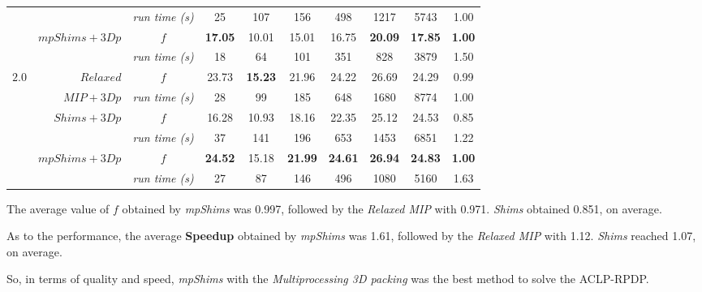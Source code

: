 \documentclass[preprint,authoryear]{elsarticle}
\begin{document}
\begin{table}[H]
\begin{tabular}{crcccccccc}
		&                                 & {\it run time (s)} &    25     &    107    &     156   &    498    &    1217   &   5743    &     1.00  \\%
		\cmidrule{2-10}		                       
		&\multirow{2}{*}{ $mpShims+3Dp$}      & $f$                &{\bf 17.05}&   10.01   &   15.01   &   16.75   &{\bf 20.09}&{\bf 17.85}&{\bf 1.00} \\%
		&                                 & {\it run time (s)} &    18     &    64     &     101   &    351    &   828     &  3879     &     1.50  \\%
		\toprule
		\multirow{7}{*}{$2.0$}&$Relaxed$  & $f$                &     23.73 &{\bf 15.23}&   21.96   &   24.22   &   26.69   &    24.29  &     0.99  \\%
		&                       $MIP+3Dp$     & {\it run time (s)} &    28     &     99    &     185   &    648    &   1680    &   8774    &     1.00  \\%
		\cmidrule{2-10}		                       
		&\multirow{2}{*}{ $Shims+3Dp$}        & $f$                &   16.28   &   10.93   &   18.16   &   22.35   &   25.12   &   24.53   &     0.85  \\%
		&                                 & {\it run time (s)} &    37     &    141    &   196     &     653   &   1453    &   6851    &     1.22  \\%
		\cmidrule{2-10}		                       
		&\multirow{2}{*}{ $mpShims+3Dp$}      & $f$                &{\bf 24.52}&   15.18   &{\bf 21.99}&{\bf 24.61}&{\bf 26.94}&{\bf 24.83}&{\bf 1.00} \\%
		&                                 & {\it run time (s)} &    27     &    87     &   146     &    496    &   1080    &   5160    &     1.63  \\%
		\bottomrule	
	\end{tabular}
	\normalsize
\end{table}

The average value of $f$ obtained by {\it mpShims} was 0.997, followed by the {\it Relaxed MIP} with 0.971.  {\it Shims} obtained 0.851, on average.

As to the performance, the average {\bf Speedup} obtained by {\it mpShims} was 1.61, followed by the {\it Relaxed MIP} with 1.12. {\it Shims} reached 1.07, on average.

So, in terms of quality and speed, {\it mpShims} with the {\it Multiprocessing 3D packing} was the best method to solve the ACLP-RPDP.
\end{document}

